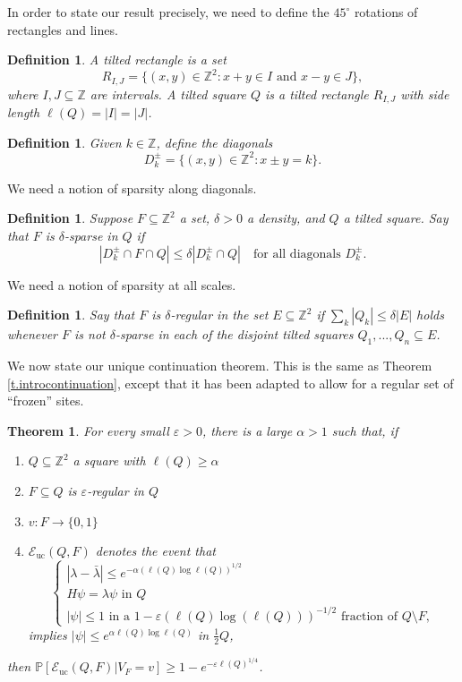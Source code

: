 \documentclass{amsart}
\newtheorem{theorem}[equation]{Theorem}
\newtheorem{definition}[equation]{Definition}
\newcommand{\tref}[1]{Theorem \ref{t.#1}}
\numberwithin{equation}{section}
\numberwithin{figure}{section}
\newcommand{\Z}{\mathbb{Z}}
\renewcommand{\P}{\mathbb{P}}
\newcommand{\ep}{\varepsilon}
\begin{document}
In order to state our result precisely, we need to define the $45^\circ$ rotations of rectangles and lines.

\begin{definition}
A tilted rectangle is a set $$R_{I,J} = \{ (x,y) \in \Z^2 : x+y \in I \mbox{ and } x-y \in J \},$$ where $I, J \subseteq \Z$ are intervals.  A tilted square $Q$ is a tilted rectangle $R_{I,J}$ with side length $\ell(Q) = |I| = |J|$.
\end{definition}

\begin{definition}
Given $k \in \Z$, define the diagonals $$D^\pm_k = \{ (x,y) \in \Z^2 : x \pm y = k \}.$$  
\end{definition}

We need a notion of sparsity along diagonals.

\begin{definition}
Suppose $F \subseteq \Z^2$ a set, $\delta > 0$ a density, and $Q$ a tilted square.  Say that $F$ is $\delta$-sparse in $Q$ if $$|D_k^\pm \cap F \cap Q| \leq \delta |D_k^\pm \cap Q| \quad \mbox{for all diagonals } D_k^\pm.$$
\end{definition}

We need a notion of sparsity at all scales.

\begin{definition}
Say that $F$ is $\delta$-regular in the set $E \subseteq \Z^2$ if $\sum_k |Q_k| \leq \delta |E|$ holds whenever $F$ is not $\delta$-sparse in each of the disjoint tilted squares $Q_1, ..., Q_n \subseteq E$.
\end{definition}

We now state our unique continuation theorem.  This is the same as \tref{introcontinuation}, except that it has been adapted to allow for a regular set of ``frozen'' sites.

\begin{theorem}
\label{t.continuation}
For every small $\ep > 0$, there is a large $\alpha > 1$ such that, if
\begin{enumerate}
\item $Q \subseteq \Z^2$ a square with $\ell(Q) \geq \alpha$
\item $F \subseteq Q$ is $\ep$-regular in $Q$
\item $v : F \to \{ 0, 1 \}$
\item $\mathcal E_{\mathrm{uc}}(Q,F)$ denotes the event that
\begin{equation*}
\begin{cases}
|\lambda - \bar \lambda| \leq e^{-\alpha (\ell(Q) \log \ell(Q))^{1/2}} \\
H \psi = \lambda \psi \mbox{ in } Q \\
|\psi| \leq 1 \mbox{ in a $1- \ep (\ell(Q) \log(\ell(Q)))^{-1/2}$ fraction of $Q \setminus F$},
\end{cases}
\end{equation*}
implies $|\psi| \leq e^{\alpha \ell(Q) \log \ell(Q)}$ in $\tfrac12 Q$,
\end{enumerate}
then $\P[\mathcal E_{\mathrm{uc}}(Q,F) | V_F = v] \geq 1 - e^{-\ep \ell(Q)^{1/4}}$.
\end{theorem}
\end{document}
